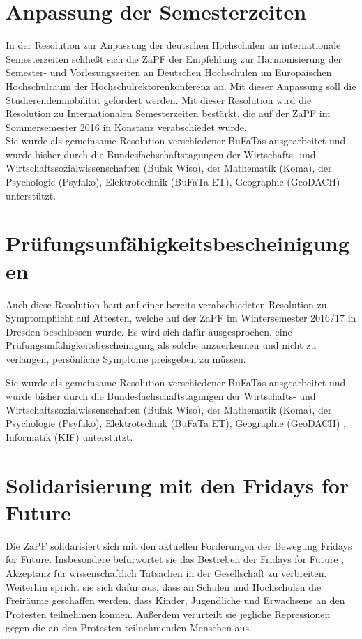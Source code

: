 \section*{Anpassung der Semesterzeiten}
In der Resolution zur Anpassung der deutschen Hochschulen an internationale Semesterzeiten schließt sich die ZaPF der \glqq Empfehlung zur Harmonisierung der Semester- und Vorlesungszeiten an Deutschen Hochschulen im Europäischen Hochschulraum \grqq{} der Hochschulrektorenkonferenz an. Mit dieser Anpassung soll die Studierendenmobilität gefördert werden.
Mit dieser Resolution wird die Resolution zu Internationalen Semesterzeiten bestärkt, die auf der ZaPF im Sommersemester 2016 in Konstanz verabschiedet wurde.\\
Sie wurde als gemeinsame Resolution verschiedener BuFaTas ausgearbeitet und wurde bisher durch die  Bundesfachschaftstagungen der Wirtschafts- und  Wirtschaftssozialwissenschaften  (Bufak Wiso), der Mathematik (Koma), der Psychologie  (Psyfako), Elektrotechnik (BuFaTa ET), Geographie (GeoDACH) unterstützt.

\section*{Prüfungsunfähigkeitsbescheinigungen}
Auch diese Resolution baut auf einer bereits verabschiedeten Resolution zu Symptompflicht auf Attesten, welche auf der ZaPF im Wintersemester 2016/17 in Dresden beschlossen wurde. 
Es wird sich  dafür ausgesprochen, eine Prüfungsunfähigkeitsbescheinigung als solche  anzuerkennen und nicht zu verlangen, persönliche Symptome preisgeben zu  müssen.

Sie wurde als gemeinsame Resolution verschiedener BuFaTas ausgearbeitet und wurde bisher durch die  Bundesfachschaftstagungen der Wirtschafts- und   Wirtschaftssozialwissenschaften  (Bufak Wiso), der Mathematik (Koma),  der Psychologie  (Psyfako), Elektrotechnik (BuFaTa ET), Geographie (GeoDACH) , Informatik (KIF) unterstützt.

\section*{Solidarisierung mit den Fridays for Future} 
Die ZaPF solidarisiert sich mit den aktuellen Forderungen der Bewegung \glqq{}Fridays for Future\grqq{}. Insbesondere befürwortet sie das Bestreben der \glqq Fridays for Future \grqq{},  Akzeptanz für wissenschaftlich Tatsachen in der Gesellschaft zu verbreiten.\\
Weiterhin spricht sie sich dafür aus, dass an Schulen und Hochschulen die Freiräume geschaffen werden, dass Kinder, Jugendliche und Erwachsene an den Protesten teilnehmen können. Außerdem verurteilt sie jegliche Repressionen gegen die an den Protesten teilnehmenden Menschen aus. 

